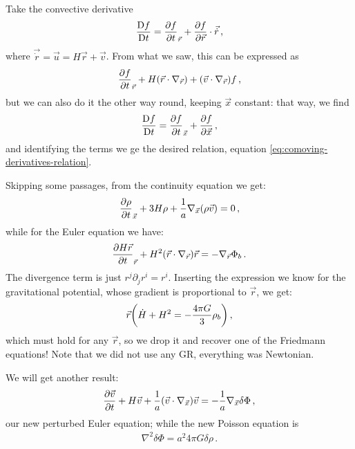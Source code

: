 \documentclass[main.tex]{subfiles}
\begin{document}
Take the convective derivative 
%
\begin{align}
  \frac{\mathrm{D} f}{\mathrm{D}t } 
  = \pdv{f}{t}_{\vec{r}} + \pdv{f}{\vec{r}} \cdot \vec{\dot{r}} 
\,,
\end{align}
%
where \(\vec{\dot{r}
} = \vec{u} = H \vec{r} + \vec{v} \). 
From what we saw, this can be expressed as 
%
\begin{align}
  \pdv{f}{t}_{\vec{r}} + H \qty(\vec{r} \cdot \nabla_{\vec{r}}  ) + \qty(\vec{v} \cdot \nabla_{\vec{r}}) f 
\,,
\end{align}
%
but we can also do it the other way round, keeping \(\vec{x}\) constant: that way, we find 
%
\begin{align}
  \frac{\mathrm{D} f}{\mathrm{D}t } 
  = \pdv{f}{t}_{\vec{x}} + \pdv{f}{\vec{x}}
\,,
\end{align}
%
and identifying the terms we ge the desired relation, equation \eqref{eq:comoving-derivatives-relation}. 

Skipping some passages, from the continuity equation we get:
%
\begin{align}
  \pdv{\rho }{t}_{\vec{x}} + 3 H \rho + 
  \frac{1}{a} \nabla_{\vec{x}} \qty(\rho \vec{v}) = 0
\,,
\end{align}
%
while for the Euler equation we have: 
%
\begin{align}
  \pdv{H \vec{r}}{t}_{\vec{r}} + H^2 \qty(\vec{r} \cdot \nabla_{\vec{r}}) \vec{r} = - \nabla_{\vec{r}} \Phi_{b}
\,. 
\end{align}
%
The divergence term is just \(r^{j} \partial_{j} r^{i} = r^{i}\). Inserting the expression we know for the gravitational potential, whose gradient is proportional to \(\vec{r}\), we get: 
%
\begin{align}
  \vec{r} \qty(\dot{H} +  H^2 = - \frac{4 \pi G }{3} \rho_{b } )
\,,
\end{align}
%
which must hold for any \(\vec{r}\), so we drop it and recover one of the Friedmann equations! 
Note that we did not use any GR, everything was Newtonian. 

We will get another result: 
%
\begin{align}
  \pdv{\vec{v}}{t} + H \vec{v} + \frac{1}{a} \qty(\vec{v} \cdot \nabla_{\vec{x}}) \vec{v} = - \frac{1}{a} \nabla_{\vec{x}} \delta \Phi 
\,,
\end{align}
%
our new perturbed Euler equation; while the new Poisson equation is 
%
\begin{align}
  \nabla^2 \delta \Phi = a^2 4 \pi G \delta \rho 
\,.
\end{align}
\end{document}
